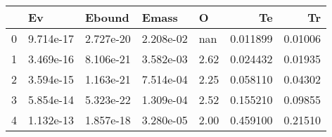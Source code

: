 \begin{tabular}{lllllrr}
\toprule
{} &         Ev &     Ebound &      Emass &     O &        Te &       Tr \\
\midrule
0 &  9.714e-17 &  2.727e-20 &  2.208e-02 &   nan &  0.011899 &  0.01006 \\
1 &  3.469e-16 &  8.106e-21 &  3.582e-03 &  2.62 &  0.024432 &  0.01935 \\
2 &  3.594e-15 &  1.163e-21 &  7.514e-04 &  2.25 &  0.058110 &  0.04302 \\
3 &  5.854e-14 &  5.323e-22 &  1.309e-04 &  2.52 &  0.155210 &  0.09855 \\
4 &  1.132e-13 &  1.857e-18 &  3.280e-05 &  2.00 &  0.459100 &  0.21510 \\
\bottomrule
\end{tabular}
